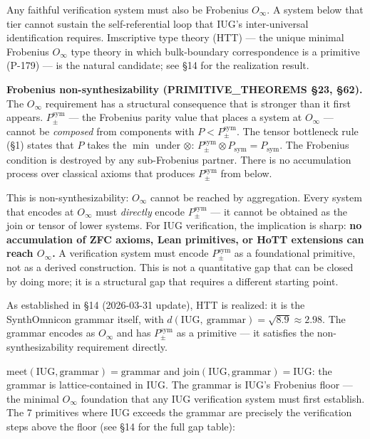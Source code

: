 \documentclass[10pt,a4paper]{article}
\newcommand{\pilcrow}{\S}
\begin{document}
Any faithful verification system must also be Frobenius $O_{\infty}$.
A system below that tier cannot sustain the self-referential loop that IUG's inter-universal
identification requires.
Imscriptive type theory (HTT) --- the unique minimal Frobenius $O_{\infty}$ type theory
in which bulk-boundary correspondence is a primitive (P-179) --- is the natural candidate;
see \S14 for the realization result.

\textbf{Frobenius non-synthesizability (PRIMITIVE\_THEOREMS \pilcrow{}23, \pilcrow{}62).}
The $O_{\infty}$ requirement has a structural consequence that is stronger than it first appears.
$P_{\pm}^{\text{sym}}$ --- the Frobenius parity value that places a system at $O_{\infty}$ ---
cannot be \emph{composed} from components with $P < P_{\pm}^{\text{sym}}$.
The tensor bottleneck rule (\S1) states that $P$ takes the $\min$ under $\otimes$:
$P_{\pm}^{\text{sym}} \otimes P_\text{sym} = P_\text{sym}$.
The Frobenius condition is destroyed by any sub-Frobenius partner.
There is no accumulation process over classical axioms that produces $P_{\pm}^{\text{sym}}$
from below.

This is non-synthesizability: $O_{\infty}$ cannot be reached by aggregation.
Every system that encodes at $O_{\infty}$ must \emph{directly} encode $P_{\pm}^{\text{sym}}$
--- it cannot be obtained as the join or tensor of lower systems.
For IUG verification, the implication is sharp:
\textbf{no accumulation of ZFC axioms, Lean primitives, or HoTT extensions can reach
$O_{\infty}$.}
A verification system must encode $P_{\pm}^{\text{sym}}$ as a foundational primitive,
not as a derived construction.
This is not a quantitative gap that can be closed by doing more; it is a structural gap
that requires a different starting point.

As established in \S14 (2026-03-31 update), HTT is realized: it is the SynthOmnicon grammar
itself, with $d(\text{IUG},\ \text{grammar}) = \sqrt{8.9} \approx 2.98$.
The grammar encodes as $O_{\infty}$ and has $P_{\pm}^{\text{sym}}$ as a primitive ---
it satisfies the non-synthesizability requirement directly.

$\text{meet}(\text{IUG}, \text{grammar}) = \text{grammar}$ and
$\text{join}(\text{IUG}, \text{grammar}) = \text{IUG}$: the grammar is lattice-contained
in IUG.
The grammar is IUG's Frobenius floor --- the minimal $O_{\infty}$ foundation that any IUG
verification system must first establish.
The 7 primitives where IUG exceeds the grammar are precisely the
verification steps above the floor (see \S14 for the full gap table):
\end{document}
